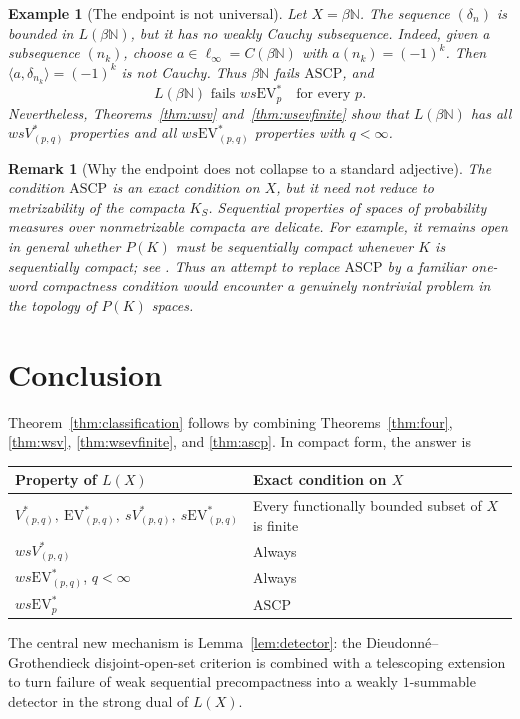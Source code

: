 \documentclass[11pt]{article}
\newtheorem{remark}[theorem]{Remark}
\newtheorem{example}[theorem]{Example}
\newcommand{\N}{\mathbb N}
\newcommand{\EV}{\mathrm{EV}}
\newcommand{\ASCP}{\mathrm{ASCP}}
\begin{document}
\begin{example}[The endpoint is not universal]\label{ex:betan}
Let $X=\beta\N$.  The sequence $(\delta_n)$ is bounded in $L(\beta\N)$, but it
has no weakly Cauchy subsequence.  Indeed, given a subsequence $(n_k)$, choose
$a\in\ell_\infty=C(\beta\N)$ with $a(n_k)=(-1)^k$.  Then
$\langle a,\delta_{n_k}\rangle=(-1)^k$ is not Cauchy.  Thus $\beta\N$ fails
$\ASCP$, and
\[
  L(\beta\N)\text{ fails }ws\EV^*_p
  \quad\text{for every }p.
\]
Nevertheless, Theorems~\ref{thm:wsv} and~\ref{thm:wsevfinite} show that
$L(\beta\N)$ has all $wsV^*_{(p,q)}$ properties and all
$ws\EV^*_{(p,q)}$ properties with $q<\infty$.
\end{example}

\begin{remark}[Why the endpoint does not collapse to a standard adjective]
The condition $\ASCP$ is an exact condition on $X$, but it need not reduce to
metrizability of the compacta $K_S$.  Sequential properties of spaces of
probability measures over nonmetrizable compacta are delicate.  For example,
it remains open in general whether $P(K)$ must be sequentially compact whenever
$K$ is sequentially compact; see \cite[Problem~7.8(4)]{Plebanek2024}.  Thus an
attempt to replace $\ASCP$ by a familiar one-word compactness condition would
encounter a genuinely nontrivial problem in the topology of $P(K)$ spaces.
\end{remark}

\section{Conclusion}

Theorem~\ref{thm:classification} follows by combining
Theorems~\ref{thm:four}, \ref{thm:wsv}, \ref{thm:wsevfinite}, and
\ref{thm:ascp}.  In compact form, the answer is
\begin{center}
\begin{tabular}{@{}ll@{}}
\toprule
Property of $L(X)$ & Exact condition on $X$\\
\midrule
$V^*_{(p,q)},\ \EV^*_{(p,q)},\ sV^*_{(p,q)},\ s\EV^*_{(p,q)}$
& Every functionally bounded subset of $X$ is finite\\
$wsV^*_{(p,q)}$ & Always\\
$ws\EV^*_{(p,q)}$, $q<\infty$ & Always\\
$ws\EV^*_p$ & $\ASCP$\\
\bottomrule
\end{tabular}
\end{center}
The central new mechanism is Lemma~\ref{lem:detector}: the
Dieudonn\'e--Grothendieck disjoint-open-set criterion is combined with a
telescoping extension to turn failure of weak sequential precompactness into a
weakly $1$-summable detector in the strong dual of $L(X)$.
\end{document}
